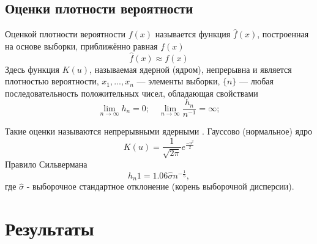 \documentclass[12pt,a4paper]{article}
\begin{document}
		\subsection{Оценки плотности вероятности}
		Оценкой плотности вероятности $f(x)$ называется функция $\hat{f}(x)$, построенная на основе выборки, приближённо равная $f(x)$
		\begin{equation}
			 \hat{f}(x) \approx f(x)
		\end{equation}
		Здесь функция $K(u)$, называемая ядерной (ядром), непрерывна и является плотностью вероятности, $x_1, ... , x_n$ — элементы выборки, $\{n\}$ — любая
		последовательность положительных чисел, обладающая свойствами
		\begin{equation}
			\lim\limits_{n \rightarrow \infty} h_n =0; \quad \lim\limits_{n \rightarrow \infty} \frac{h_n}{n^{-1}} = \infty;
		\end{equation}

		Такие оценки называются непрерывными ядерными \cite{emp1}.
		\break
		Гауссово (нормальное) ядро \cite{emp2}
		\begin{equation}
			K(u)=\frac{1}{\sqrt{2\pi}}e^{\frac{-u^2}{2}}
		\end{equation}
		Правило Сильвермана \cite{emp2}
		\begin{equation}
			h_n1=1.06 \hat{\sigma}n^{-\frac{1}{5}},
		\end{equation}
		где $\hat{\sigma}$ - выборочное стандартное отклонение (корень выборочной дисперсии).
		\newpage
				
	
	\section{Результаты}
\end{document}
